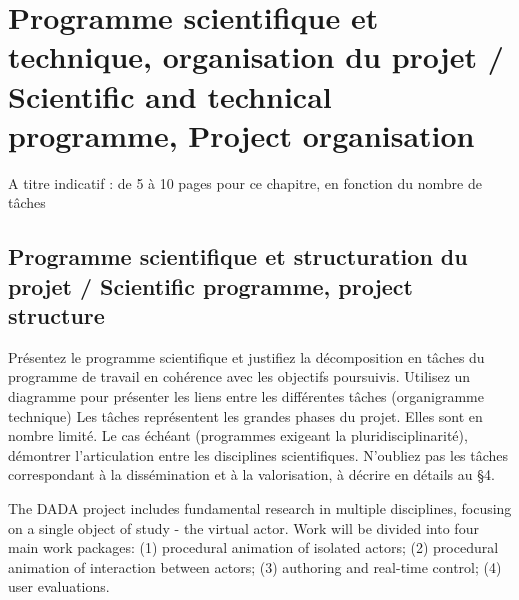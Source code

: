 
\section{Programme scientifique et technique, organisation du projet / Scientific and technical programme, Project organisation}
\begin{xcomment}  
A titre indicatif : de 5 à 10  pages pour ce chapitre, en fonction du nombre de tâches
\end{xcomment}

\subsection{Programme scientifique et structuration du projet  / Scientific programme, project structure}
\begin{xcomment}  
 Pr\'esentez le programme scientifique et justifiez la d\'ecomposition en tâches du programme de travail en coh\'erence avec les objectifs poursuivis. 
Utilisez un diagramme pour pr\'esenter les liens entre les diff\'erentes tâches (organigramme technique)
Les tâches repr\'esentent les grandes phases du projet. Elles sont en nombre limit\'e.
Le cas \'ech\'eant (programmes exigeant la pluridisciplinarit\'e), d\'emontrer l'articulation entre les disciplines scientifiques.
N'oubliez pas les tâches correspondant à la diss\'emination et à la valorisation, à d\'ecrire en d\'etails au §4.

\end{xcomment}

The DADA project includes fundamental research in multiple disciplines, focusing on a single object of study - the virtual actor. Work will be divided into four main work packages: (1) procedural animation of isolated actors; (2) procedural animation of interaction between actors; (3) authoring and real-time control; (4) user evaluations. 

